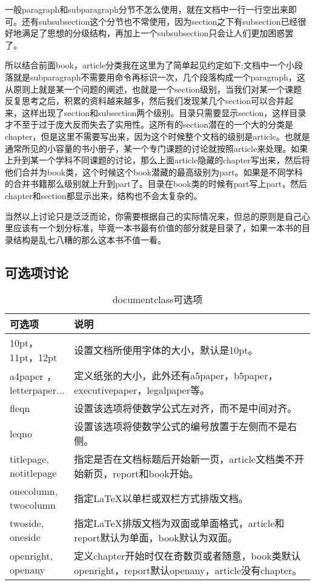 一般paragraph和subparagraph分节不怎么使用，就在文档中一行一行空出来即可。还有subsubsection这个分节也不常使用，因为section之下有subsection已经很好地满足了思想的分级结构，再加上一个subsubsection只会让人们更加困惑罢了。

所以结合前面book，article分类我在这里为了简单起见约定如下:文档中一个小段落就是subparagraph不需要用命令再标识一次，几个段落构成一个paragraph，这从原则上就是某一个问题的阐述，也就是一个section级别，当我们对某一个课题反复思考之后，积累的资料越来越多，然后我们发现某几个section可以合并起来，这样出现了section和subsection两个级别。目录只需要显示section，这样目录才不至于过于庞大反而失去了实用性。这所有的section潜在的一个大的分类是chapter，但是这里不需要写出来，因为这个时候整个文档的级别是article。也就是通常所见的小容量的书小册子，某一个专门课题的讨论就按照article来处理。如果上升到某一个学科不同课题的讨论，那么上面article隐藏的chapter写出来，然后将他们合并为book类，这个时候这个book潜藏的最高级别为part。如果是不同学科的合并书籍那么级别就上升到part了。目录在book类的时候有part写上part，然后chapter和section都显示出来，结构也不会太复杂的。

当然以上讨论只是泛泛而论，你需要根据自己的实际情况来，但总的原则是自己心里应该有一个划分标准，毕竟一本书最有价值的部分就是目录了，如果一本书的目录结构是乱七八糟的那么这本书不值一看。


\subsection{可选项讨论}
\begin{table}[h]
\begin{tabular}{@{}p{0.2\linewidth}p{0.8\linewidth}@{}}
\toprule
可选项  &   说明  \\  \midrule
10pt，11pt，12pt   &   设置文档所使用字体的大小，默认是10pt。\\
a4paper ，letterpaper...   &   定义纸张的大小，此外还有a5paper，b5paper，executivepaper，legalpaper等。\\
fleqn    &   设置该选项将使数学公式左对齐，而不是中间对齐。\\
leqno    &   设置该选项将使数学公式的编号放置于左侧而不是右侧。\\
titlepage, notitlepage    &   指定是否在文档标题后开始新一页，article文档类不开始新页，report和book开始。\\
onecolumn, twocolumn    &   指定LaTeX以单栏或双栏方式排版文档。\\
twoside, oneside    &   指定LaTeX排版文档为双面或单面格式，article和report默认为单面，book默认为双面。\\
openright, openany   &    定义chapter开始时仅在奇数页或者随意，book类默认openright，report默认openany，article没有chapter。\\ \bottomrule
\end{tabular}
\label{tab:documentclass可选项}
\caption{documentclass可选项}
\end{table}


